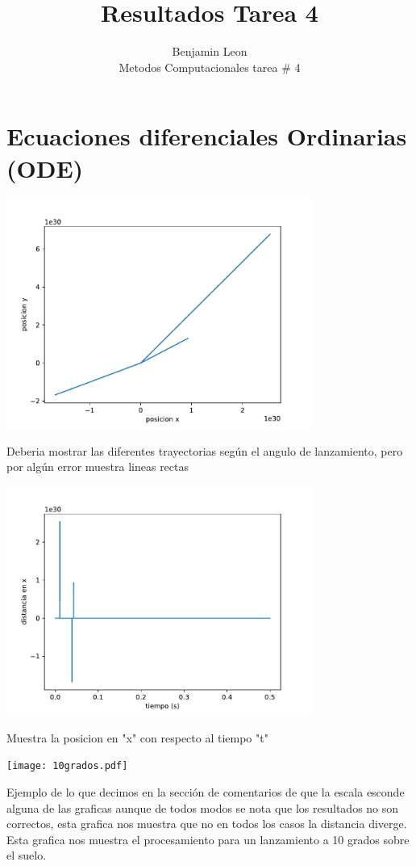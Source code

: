 \documentclass[12pt]{article}
\begin{document}
 

 
\title{Resultados Tarea 4}
\author{Benjamin Leon\\
Metodos Computacionales tarea \# 4} 
\maketitle


\section{Ecuaciones diferenciales Ordinarias (ODE)}
\begin{centering}
\includegraphics[width=0.75\textwidth]{grafsODE.pdf}

Deberia mostrar las diferentes trayectorias seg\'un el angulo de lanzamiento, pero por alg\'un error muestra lineas rectas

\includegraphics[width=0.75\textwidth]{grafsODE2.pdf}

Muestra la posicion en "x" con respecto al tiempo "t"

\texttt{[image: 10grados.pdf]}

Ejemplo de lo que decimos en la secci\'on de comentarios de que la escala esconde alguna de las graficas aunque de todos modos se nota que los resultados no son correctos, esta grafica nos muestra que no en todos los casos la distancia diverge. Esta grafica nos muestra el procesamiento para un lanzamiento a 10 grados sobre el suelo.
\end{centering}
\end{document}
